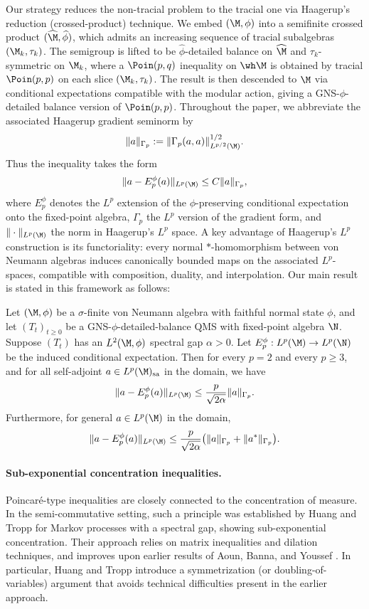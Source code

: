 \documentclass[sn-mathphys-num]{sn-jnl}
\begin{document}
Our strategy reduces the non-tracial problem to the tracial one via Haagerup's
reduction (crossed-product) technique.
We embed $(\M,\phi)$ into a semifinite crossed product $(\widehat{\M},\widehat{\phi})$,
which admits an increasing sequence of tracial subalgebras $(\M_k,\tau_k)$.
The semigroup is lifted to be $\widehat{\phi}$-detailed balance on $\widehat{\M}$ and $\tau_k$-symmetric on $\M_k$,
where a $\Poin(p,q)$ inequality on $\wh\M$ is obtained by tracial $\Poin(p,p)$
on each slice $(\M_k,\tau_k)$.
The result is then descended to $\M$ via conditional expectations compatible
with the modular action, giving a GNS-$\phi$-detailed balance version of $\Poin(p,p)$.
Throughout the paper, we abbreviate the associated Haagerup gradient seminorm by
\[
  \|a\|_{\Gamma_p}
  :=\|\Gamma_p(a,a)\|_{L^{p/2}(\M)}^{1/2}.
\]
Thus the inequality takes the form
\[
  \|a-E_p^\phi(a)\|_{L^p(\M)}
  \le C\|a\|_{\Gamma_p},
\]
where $E_p^\phi$ denotes the $L^p$ extension of the $\phi$-preserving conditional expectation onto the fixed-point algebra,
$\Gamma_p$ the $L^p$ version of the gradient form, and $\|\cdot\|_{L^p(\M)}$ the norm in Haagerup's $L^p$ space.
A key advantage of Haagerup's $L^p$ construction is its functoriality: every normal $*$-homomorphism between von Neumann algebras induces canonically bounded maps on the associated $L^p$-spaces, compatible with composition, duality, and interpolation.
Our main result is stated in this framework as follows:
\medskip
\begin{theorem}\label{main:GNS}
Let $(\M,\phi)$ be a $\sigma$-finite von Neumann algebra with faithful normal state $\phi$, and let $(T_t)_{t\ge0}$ be a GNS-$\phi$-detailed-balance QMS with fixed-point algebra $\N$. Suppose $(T_t)$ has an $L^2(\M,\phi)$ spectral gap $\alpha>0$. Let $E_p^\phi:L^p(\M)\to L^p(\N)$ be the induced conditional expectation. Then for every $p=2$ and every $p\ge3$, and for all self-adjoint $a\in L^p(\M)_{\mathrm{sa}}$ in the domain, we have
\[
\|a-E_p^\phi(a)\|_{L^p(\M)} \leq \frac{p}{\sqrt{2\alpha}}\|a\|_{\Gamma_p}.
\]
Furthermore, for general $a\in L^p(\M)$ in the domain,
\[
\|a-E_p^\phi(a)\|_{L^p(\M)} \leq \frac{p}{\sqrt{2\alpha}}
\bigl(\|a\|_{\Gamma_p}+\|a^*\|_{\Gamma_p}\bigr).
\]
\end{theorem}

\paragraph{Sub-exponential concentration inequalities.}
Poincar\'e-type inequalities are closely connected to the concentration of
measure. In the semi-commutative setting, such a principle was established by
Huang and Tropp \cite[Thm~2.7]{huang2021poincare} for Markov processes with a spectral
gap, showing sub-exponential concentration.
Their approach relies on matrix inequalities and dilation techniques, and improves
upon earlier results of Aoun, Banna, and Youssef \cite{Aoun_Banna_Youssef_2020}.
In particular, Huang and Tropp introduce a symmetrization (or doubling-of-variables)
argument that avoids technical difficulties present in the earlier approach.
\end{document}
